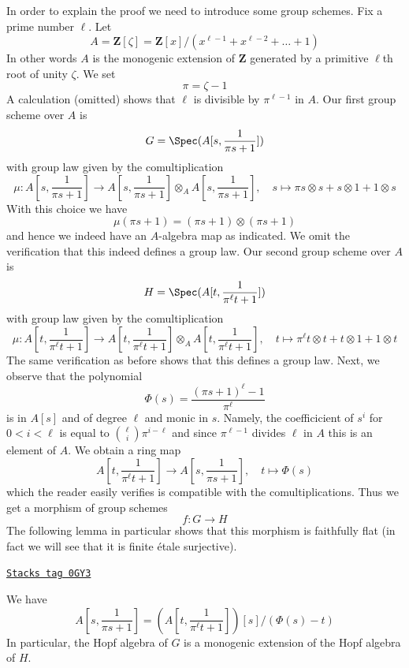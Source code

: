 In order to explain the proof we need to introduce some group schemes.
Fix a prime number $\ell$. Let
$$
A = \mathbf{Z}[\zeta] =
\mathbf{Z}[x]/(x^{\ell - 1} + x^{\ell - 2} + \ldots + 1)
$$
In other words $A$ is the monogenic extension of $\mathbf{Z}$ generated by
a primitive $\ell$th root of unity $\zeta$. We set
$$
\pi = \zeta - 1
$$
A calculation (omitted) shows that $\ell$ is divisible by $\pi^{\ell - 1}$
in $A$. Our first group scheme over $A$ is
$$
G = \Spec(A[s, \frac{1}{\pi s + 1}])
$$
with group law given by the comultiplication
$$
\mu :
A[s, \frac{1}{\pi s + 1}]
\longrightarrow
A[s, \frac{1}{\pi s + 1}] \otimes_A A[s, \frac{1}{\pi s + 1}],\quad
s \longmapsto \pi s \otimes s + s \otimes 1 + 1 \otimes s
$$
With this choice we have
$$
\mu(\pi s + 1) = (\pi s + 1) \otimes (\pi s + 1)
$$
and hence we indeed have an $A$-algebra map as indicated. We omit the
verification that this indeed defines a group law. Our second group
scheme over $A$ is
$$
H = \Spec(A[t, \frac{1}{\pi^\ell t + 1}])
$$
with group law given by the comultiplication
$$
\mu : A[t, \frac{1}{\pi^\ell t + 1}]
\longrightarrow
A[t, \frac{1}{\pi^\ell t + 1}] \otimes_A A[t, \frac{1}{\pi^\ell t + 1}],\quad
t \longmapsto \pi^\ell t \otimes t + t \otimes 1 + 1 \otimes t
$$
The same verification as before shows that this defines a group law.
Next, we observe that the polynomial
$$
\Phi(s) = \frac{(\pi s + 1)^\ell - 1}{\pi^\ell}
$$
is in $A[s]$ and of degree $\ell$ and monic in $s$. Namely, the coefficicient
of $s^i$ for $0 < i < \ell$ is equal to ${\ell \choose i}\pi^{i - \ell}$
and since $\pi^{\ell - 1}$ divides $\ell$ in $A$ this is an element of $A$.
We obtain a ring map
$$
A[t, \frac{1}{\pi^\ell t + 1}]
\longrightarrow
A[s, \frac{1}{\pi s + 1}],\quad
t \longmapsto \Phi(s)
$$
which the reader easily verifies is compatible with the comultiplications.
Thus we get a morphism of group schemes
$$
f : G \to H
$$
The following lemma in particular shows that this morphism is faithfully
flat (in fact we will see that it is finite \'etale surjective).

\begin{lemma}
\label{etale-cohomology-lemma-monogenic-one}
\href{https://stacks.math.columbia.edu/tag/0GY3}{\texttt{Stacks tag 0GY3}}

We have
$$
A[s, \frac{1}{\pi s + 1}] =
\left(A[t, \frac{1}{\pi^\ell t + 1}]\right)[s]/(\Phi(s) - t)
$$
In particular, the Hopf algebra of $G$ is a monogenic extension
of the Hopf algebra of $H$.
\end{lemma}

